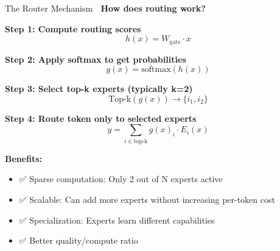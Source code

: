\documentclass[aspectratio=169]{beamer}
\begin{document}
\begin{frame}{The Router Mechanism 🎯}
\textbf{How does routing work?}

\vspace{0.5em}

\textbf{Step 1: Compute routing scores}
$$h(x) = W_{\text{gate}} \cdot x$$

\vspace{0.3em}

\textbf{Step 2: Apply softmax to get probabilities}
$$g(x) = \text{softmax}(h(x))$$

\vspace{0.3em}

\textbf{Step 3: Select top-k experts (typically k=2)}
$$\text{Top-k}(g(x)) \rightarrow \{i_1, i_2\}$$

\vspace{0.3em}

\textbf{Step 4: Route token only to selected experts}
$$y = \sum_{i \in \text{top-k}} g(x)_i \cdot E_i(x)$$

\vspace{0.5em}

\textbf{Benefits:}
\begin{itemize}\setlength{\itemsep}{0pt}
    \item ✅ Sparse computation: Only 2 out of N experts active
    \item ✅ Scalable: Can add more experts without increasing per-token cost
    \item ✅ Specialization: Experts learn different capabilities
    \item ✅ Better quality/compute ratio
\end{itemize}
\end{frame}
\end{document}
